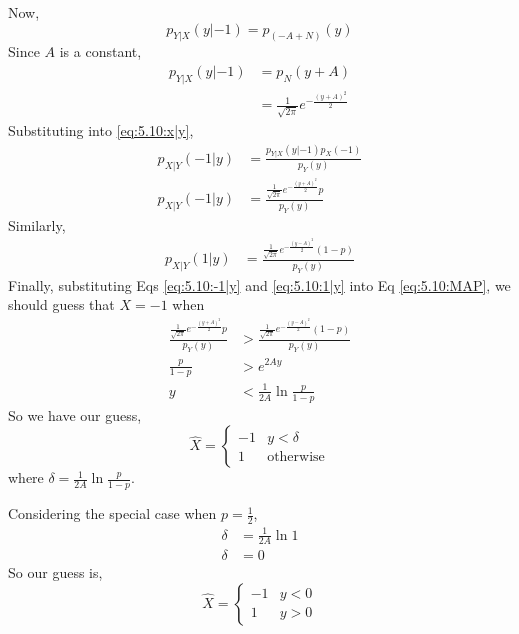 \documentclass[journal,12pt,twocolumn]{IEEEtran}
\renewcommand\thesection{\arabic{section}}
\begin{document}
\begin{enumerate}[label=\thesection.\arabic*
,ref=\thesection.\theenumi]
        Now,
        \begin{equation}
            p_{Y|X}(y|-1) = p_{(-A+N)}(y)
        \end{equation}
        Since $A$ is a constant,
        \begin{align}
            p_{Y|X}(y|-1) &= p_{N}(y + A) \\
            &= \frac{1}{\sqrt{2 \pi}}e^{-\frac{(y + A)^2}{2}}
        \end{align}
        Substituting into \eqref{eq:5.10:x|y},
        \begin{align}
            p_{X|Y}(-1|y) &= \frac{p_{Y|X}(y|-1)p_X(-1)}{p_Y(y)} \\
            p_{X|Y}(-1|y) &= \frac{\frac{1}{\sqrt{2 \pi}} e^{-\frac{(y+A)^2}{2}} p}{p_Y(y)}
                \label{eq:5.10:-1|y}
        \end{align}
        Similarly,
        \begin{align}
            p_{X|Y}(1|y) &= \frac{\frac{1}{\sqrt{2 \pi}} e^{-\frac{(y-A)^2}{2}} (1-p)}{p_Y(y)}
                \label{eq:5.10:1|y}
        \end{align}
        Finally, substituting Eqs \eqref{eq:5.10:-1|y} and \eqref{eq:5.10:1|y} into Eq
        \eqref{eq:5.10:MAP}, we should guess that $X = -1$ when
        \begin{align}
            \frac{\frac{1}{\sqrt{2 \pi}} e^{-\frac{(y+A)^2}{2}} p}{p_Y(y)}
                &> \frac{\frac{1}{\sqrt{2 \pi}} e^{-\frac{(y-A)^2}{2}} (1-p)}{p_Y(y)} \\
            \frac{p}{1-p} &> e^{2 A y} \\
            y &< \frac{1}{2A} \ln \frac{p}{1-p}
        \end{align}
        So we have our guess,
        \begin{equation}
            \hat{X} = \begin{cases}
                -1 & y < \delta \\
                1 & \text{otherwise}
            \end{cases}
        \end{equation}
        where $\delta = \frac{1}{2A} \ln \frac{p}{1-p}$.

        Considering the special case when $p=\frac{1}{2}$,
        \begin{align}
            \delta &= \frac{1}{2 A} \ln 1 \\
            \delta &= 0
        \end{align}
        So our guess is,
        \begin{equation}
            \hat{X} = \begin{cases}
                -1 & y < 0 \\
                1 & y > 0
            \end{cases}
        \end{equation}
		\end{enumerate}
\end{document}
